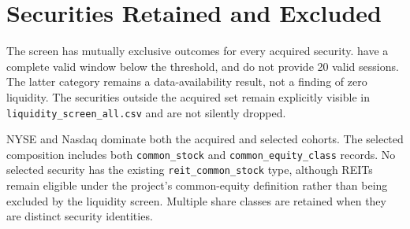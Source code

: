 \section{Securities Retained and Excluded}

The screen has mutually exclusive outcomes for every acquired security.
\BelowThreshold{} have a complete valid window below the threshold, and
\InsufficientWindow{} do not provide 20 valid sessions. The latter category
remains a data-availability result, not a finding of zero liquidity. The
\NotAcquired{} securities outside the acquired set remain explicitly visible
in \texttt{liquidity\_screen\_all.csv} and are not silently dropped.

\begin{table}[tbp]
\centering
\caption{Composition before and after screening}
\label{tab:composition}
\end{table}

NYSE and Nasdaq dominate both the acquired and selected cohorts. The selected
composition includes both \texttt{common\_stock} and
\texttt{common\_equity\_class} records. No selected security has the existing
\texttt{reit\_common\_stock} type, although REITs remain eligible under the
project's common-equity definition rather than being excluded by the liquidity
screen. Multiple share classes are retained when they are distinct security
identities.

